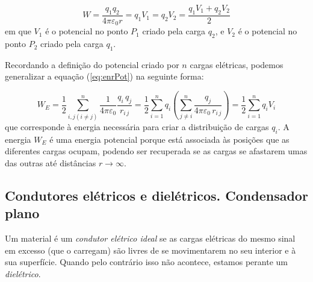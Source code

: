 \documentclass[12pt,a4paper,oneside]{paper}
\begin{document}
\begin{equation}\label{eq:enrPot}
 W = \frac{q_1 q_2}{4 \pi \varepsilon_0 r} = q_1 V_1 = q_2 V_2 =  \frac{q_1 V_1 +q_2 V_2}{2} 
\end{equation}
em que $V_1$ é o potencial no ponto $P_1$ criado pela carga $q_2$, e $V_2$ é o potencial no ponto $P_2$ criado pela
carga $q_1$. 

Recordando a definição do potencial criado por $n$ cargas elétricas, podemos generalizar a equação (\ref{eq:enrPot}) na
seguinte forma:

\begin{equation}%
 W_E =  \frac{1}{2} \sum_{i,j (i\ne j)}^n \frac{ 1 }{4 \pi \varepsilon_0} \frac{ q_i \, q_j }{r_{i\,j}}  = 
	 \frac{1}{2} \sum_{i=1}^n q_i \left( \sum_{j \ne i}^n \frac{ q_j }{4 \pi \varepsilon_0 \,r_{i\,j}} \right) =
	\frac{1}{2} \sum_{i=1}^n q_i V_i
\end{equation}
que corresponde à energia necessária para criar a distribuição de cargas $q_i$. A energia $W_E$ é uma energia potencial
porque está associada às posições que as diferentes cargas ocupam, podendo ser recuperada se as cargas se afastarem umas
das outras até distâncias $r \to \infty$.

\subsection{Condutores elétricos e dielétricos. Condensador plano}
Um material é um \emph{condutor elétrico ideal} se as cargas elétricas do mesmo sinal em excesso (que o carregam) são
livres de se movimentarem no seu interior e à sua superfície. Quando pelo contrário isso não acontece, estamos perante
um \emph{dielétrico}.
\end{document}
